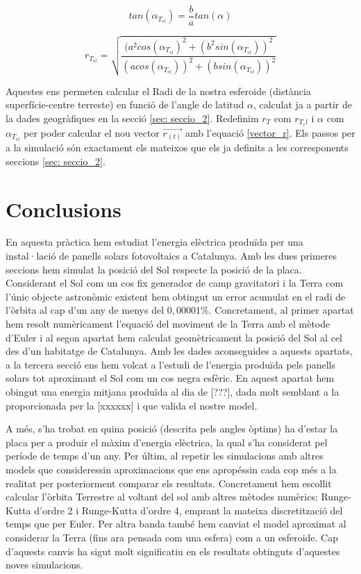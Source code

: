 \documentclass[11pt]{article}
\begin{document}
\begin{equation}
    tan(\alpha_{T_{el}}) = \frac{b}{a}tan(\alpha) 
    \label{eq: alphatel}
\end{equation}

\begin{equation}
    r_{T_{el}} = \sqrt{\frac{(a^2cos(\alpha_{T_{el}})^2+(b^2sin(\alpha_{T_{el}}))^2}{(acos(\alpha_{T_{el}}))^2+(bsin(\alpha_{T_{el}}))^2}}
    \label{eq: rtel}
\end{equation}

Aquestes ens permeten calcular el Radi de la nostra esferoide (distància superfície-centre terreste) en funció de l'angle de latitud $\alpha$, calculat ja a partir de la dades geogràfiques en la secció \ref{sec: seccio_2}. Redefinim $r_T$ com $r_{T_el}$ i $\alpha$ com $\alpha_{T_{el}}$ per poder calcular el nou vector $\vec{r_{(t)}}$ amb l'equació \eqref{vector_r}. Els passos per a la simulació són exactament els mateixos que els ja definits a les corresponents seccions \ref{sec: seccio_2}.

\section{Conclusions}
En aquesta pràctica hem estudiat l'energia elèctrica produïda per una instal·lació de panells solars fotovoltaics a Catalunya. Amb les dues primeres seccions hem simulat la posició del Sol respecte la posició de la placa. Considerant el Sol com un cos fix generador de camp gravitatori i la Terra com l'únic objecte astronòmic existent hem obtingut un error acumulat en el radi de l'òrbita al cap d'un any de menys del $0,00001\%$. Concretament, al primer apartat hem resolt numèricament l'equació del moviment de la Terra amb el mètode d'Euler i al segon apartat hem calculat geomètricament la posició del Sol al cel des d'un habitatge de Catalunya. Amb les dades aconseguides a aquests apartats, a la tercera secció ens hem volcat a l'estudi de l'energia produïda pels panells solars tot aproximant el Sol com un cos negra esfèric. En aquest apartat hem obingut una energia mitjana produïda al dia de [???], dada molt semblant a la proporcionada per la [xxxxxx] i que valida el nostre model.

A més, s'ha trobat en quina posició (descrita pels angles òptims) ha d'estar la placa per a produir el màxim d'energia elèctrica, la qual s'ha considerat pel període de temps d'un any. Per últim, al repetir les simulacions amb altres models que consideressin aproximacions que ens apropéssin cada cop més a la realitat per posteriorment comparar els resultats. Concretament hem escollit calcular l'òrbita Terrestre al voltant del sol amb altres mètodes numèrics: Runge-Kutta d'ordre 2 i Runge-Kutta d'ordre 4, emprant la mateixa discretització del temps que per Euler. Per altra banda també hem canviat el model aproximat al considerar la Terra (fins ara pensada com una esfera) com a un esferoide. Cap d'aquests canvis ha sigut molt significatiu en els resultats obtinguts d'aquestes noves simulacions. 
\end{document}
